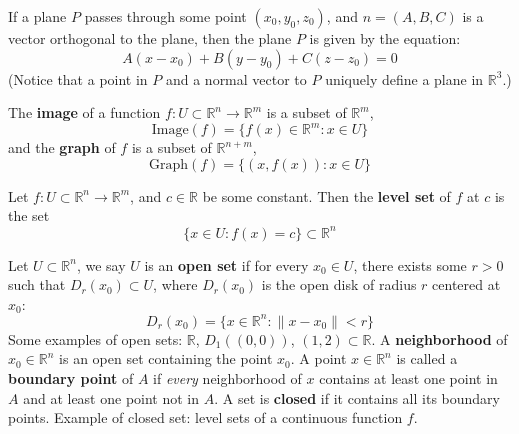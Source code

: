 \documentclass[openany]{book}
\newcommand{\R}{\mathbb{R}}
\begin{document}
\begin{defn}[Plane in $\R^3$]\label{plane}
   If a plane ${P}$ passes through some point $(x_0,y_0,z_0)$, and $n=(A,B,C)$ is a vector orthogonal to the plane, then the plane ${P}$ is given by the equation:
    \begin{equation*}
        A(x-x_0)+B(y-y_0)+C(z-z_0)=0
    \end{equation*}
    (Notice that a point in ${P}$ and a normal vector to ${P}$ uniquely define a plane in $\R^3$.)
\end{defn}


\begin{defn}
    The \textbf{image} of a function $f: U\subset\R^n\to\R^m$ is a subset of $\R^m$,
    \begin{equation*}
        \text{Image}(f)=\{f(x)\in\R^m: x\in U\}
    \end{equation*}
    and the \textbf{graph} of $f$ is a subset of $\R^{n+m}$,
    \begin{equation*}
        \text{Graph}(f)=\{(x,f(x)): x\in U\}
    \end{equation*}
\end{defn}


\begin{defn}
    Let $f:U\subset\R^n\to\R^m$, and $c\in\R$ be some constant. Then the \textbf{level set} of $f$ at $c$ is the set 
    \begin{equation*}
        \{x\in U: f(x)=c\}\subset\R^n
    \end{equation*}
\end{defn}

\begin{defn}
    Let $U\subset\R^n$, we say $U$ is an \textbf{open set} if for every $x_0\in U$, there exists some $r>0$ such that $D_r(x_0)\subset U$, where $D_r(x_0)$ is the open disk of radius $r$ centered at $x_0$:
    \begin{equation*}
        D_r(x_0)=\{x\in\R^n: \|x-x_0\|<r\}
    \end{equation*}
    Some examples of open sets: $\R$, $D_{1}((0,0))$, $(1,2)\subset\R$.
    A \textbf{neighborhood} of $x_0\in\R^n$ is an open set containing the point $x_0$. A point $x\in\R^n$ is called a \textbf{boundary point} of $A$ if \textit{every} neighborhood of $x$ contains at least one point in $A$ and at least one point not in $A$. A set is \textbf{closed} if it contains all its boundary points. Example of closed set: level sets of a continuous function $f$.
\end{defn}
\end{document}
